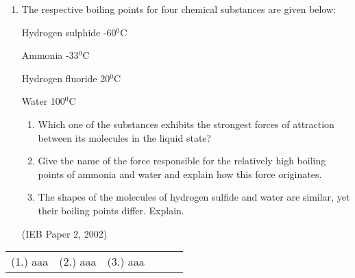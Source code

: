 \begin{eocexercises}{}
\begin{enumerate}
\item{The respective boiling points for four chemical substances are given below:

Hydrogen sulphide -60$^{0}$C

Ammonia -33$^{0}$C

Hydrogen fluoride 20$^{0}$C

Water 100$^{0}$C

\begin{enumerate}
\item{Which one of the substances exhibits the strongest forces of attraction between its molecules in the liquid state?}
\item{Give the name of the force responsible for the relatively high boiling points of ammonia and water and explain how this force originates.}
\item{The shapes of the molecules of hydrogen sulfide and water are similar, yet their boiling points differ. Explain.}
\end{enumerate}

}
(IEB Paper 2, 2002)
\end{enumerate}

\practiceinfo

\begin{tabular}[h]{cccccc}
(1.) aaa & (2.) aaa & (3.) aaa & 
 \end{tabular}
\end{eocexercises}






